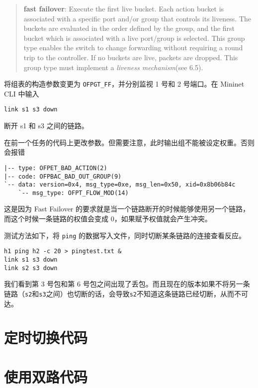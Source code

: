     \begin{quotation}
        \textbf{fast failover}: Execute the first live bucket. Each action bucket is associated with a specific
port and/or group that controls its liveness. The buckets are evaluated in the order defined by the
group, and the first bucket which is associated with a live port/group is selected. This group type
enables the switch to change forwarding without requiring a round trip to the controller. If no buckets
are live, packets are dropped. This group type must implement a \emph{liveness mechanism}(see 6.5).\cite{openflow13}
    \end{quotation}

    将组表的构造参数变更为 \verb"OFPGT_FF"，并分别监视 1 号和 2 号端口。在 Mininet CLI 中输入
    \begin{lstlisting}[style=commandshell]
    link s1 s3 down\end{lstlisting}
    断开 s1 和 s3 之间的链路\cite{mininetdown}。

    在前一个任务的代码上更改参数。但需要注意，此时输出组不能被设定权重。否则会报错
    \begin{verbatim}
|-- type: OFPET_BAD_ACTION(2)
|-- code: OFPBAC_BAD_OUT_GROUP(9)
`-- data: version=0x4, msg_type=0xe, msg_len=0x50, xid=0x8b06b84c
    `-- msg_type: OFPT_FLOW_MOD(14)       
    \end{verbatim}
    这是因为 Fast Failover 的要求就是当一个链路断开的时候能够使用另一个链路，而这个时候一条链路的权值会变成 0，如果赋予权值就会产生冲突。


    测试方法如下，将 \verb"ping" 的数据写入文件，同时切断某条链路的连接查看反应。
    \begin{lstlisting}[style=commandshell]
h1 ping h2 -c 20 > pingtest.txt &
link s1 s3 down
link s2 s3 down\end{lstlisting}


    我们看到第 3 号包和第 6 号包之间出现了丢包。而且现在的版本如果不将另一条链路（\verb"s2"和\verb"s3"之间）也切断的话，会导致\verb"s2"不知道这条链路已经切断，从而不可达。
    

    

    

    \appendix

    \section{定时切换代码}\label{sec:per5}


    \section{使用双路代码}\label{sec:balance}



